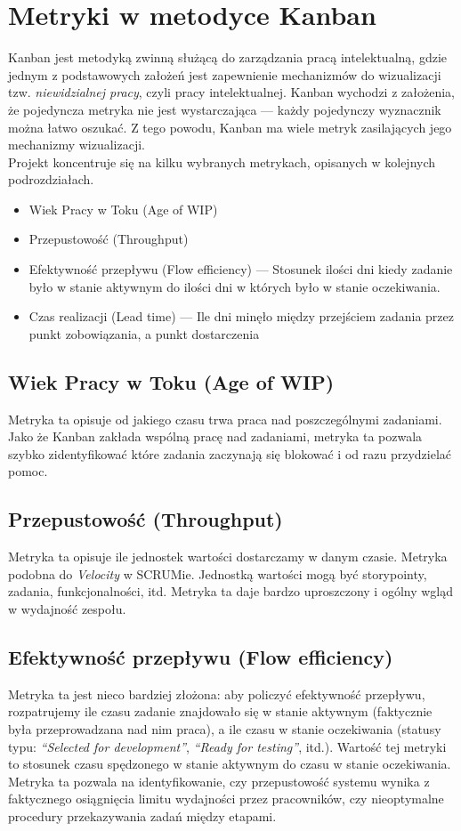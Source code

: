 \section{Metryki w metodyce Kanban}
Kanban jest metodyką zwinną służącą do zarządzania pracą intelektualną, gdzie jednym z podstawowych założeń jest zapewnienie mechanizmów
do wizualizacji tzw. \textit{niewidzialnej pracy}, czyli pracy intelektualnej. Kanban wychodzi z założenia, że pojedyncza metryka nie jest wystarczająca --- każdy
pojedynczy wyznacznik można łatwo oszukać. Z tego powodu, Kanban ma wiele metryk zasilających jego mechanizmy wizualizacji.\\
Projekt koncentruje się na kilku wybranych metrykach, opisanych w kolejnych podrozdziałach.
\begin{itemize}
    \item Wiek Pracy w Toku (Age of WIP)
    \item Przepustowość (Throughput)
    \item Efektywność przepływu (Flow efficiency) --- Stosunek ilości dni kiedy zadanie było w stanie aktywnym do ilości dni w których było w stanie oczekiwania.
    \item Czas realizacji (Lead time) --- Ile dni minęło między przejściem zadania przez punkt zobowiązania, a punkt dostarczenia %
\end{itemize}

\subsection{Wiek Pracy w Toku (Age of WIP)}
Metryka ta opisuje od jakiego czasu trwa praca nad poszczególnymi zadaniami. Jako że Kanban zakłada wspólną pracę nad zadaniami, metryka ta pozwala szybko 
zidentyfikować które zadania zaczynają się blokować i od razu przydzielać pomoc.

\subsection{Przepustowość (Throughput)}
Metryka ta opisuje ile jednostek wartości dostarczamy w danym czasie. Metryka podobna do \textit{Velocity} w SCRUMie. Jednostką wartości mogą być storypointy, zadania, funkcjonalności, itd.
Metryka ta daje bardzo uproszczony i ogólny wgląd w wydajność zespołu.

\subsection{Efektywność przepływu (Flow efficiency)}
Metryka ta jest nieco bardziej złożona: aby policzyć efektywność przepływu, rozpatrujemy ile czasu zadanie znajdowało się w stanie aktywnym (faktycznie była przeprowadzana nad nim praca), a ile czasu
w stanie oczekiwania (statusy typu: \textit{``Selected for development''}, \textit{``Ready for testing''}, itd.). Wartość tej metryki to stosunek czasu spędzonego w stanie aktywnym do czasu w stanie oczekiwania.
Metryka ta pozwala na identyfikowanie, czy przepustowość systemu wynika z faktycznego osiągnięcia limitu wydajności przez pracowników, czy nieoptymalne procedury przekazywania zadań między etapami.


